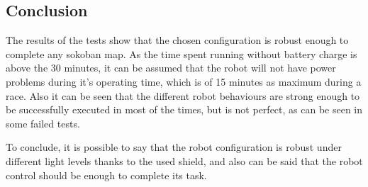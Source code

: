 \subsection{Conclusion}
	The results of the tests show that the chosen configuration is robust enough to complete any sokoban map.
	As the time spent running without battery charge is above the 30 minutes, it can be assumed that the robot will not have power problems during it's operating time, which is of 15 minutes as maximum during a race.
	Also it can be seen that the different robot behaviours are strong enough to be successfully executed in most of the times, but is not perfect, as can be seen in some failed tests.
	
	To conclude, it is possible to say that the robot configuration is robust under different light levels thanks to the used shield, and also can be said that the robot control should be enough to complete its task.
	
	
